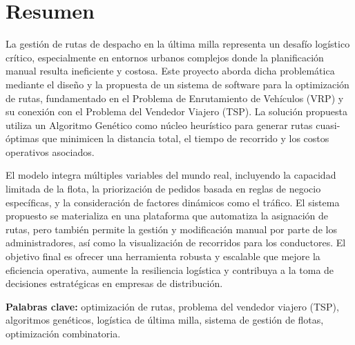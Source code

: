 \chapter*{Resumen}

La gestión de rutas de despacho en la última milla representa un desafío logístico crítico, especialmente en entornos urbanos complejos donde la planificación manual resulta ineficiente y costosa. Este proyecto aborda dicha problemática mediante el diseño y la propuesta de un sistema de software para la optimización de rutas, fundamentado en el Problema de Enrutamiento de Vehículos (VRP) y su conexión con el Problema del Vendedor Viajero (TSP). La solución propuesta utiliza un Algoritmo Genético como núcleo heurístico para generar rutas cuasi-óptimas que minimicen la distancia total, el tiempo de recorrido y los costos operativos asociados.

El modelo integra múltiples variables del mundo real, incluyendo la capacidad limitada de la flota, la priorización de pedidos basada en reglas de negocio específicas, y la consideración de factores dinámicos como el tráfico. El sistema propuesto se materializa en una plataforma que automatiza la asignación de rutas, pero también permite la gestión y modificación manual por parte de los administradores, así como la visualización de recorridos para los conductores. El objetivo final es ofrecer una herramienta robusta y escalable que mejore la eficiencia operativa, aumente la resiliencia logística y contribuya a la toma de decisiones estratégicas en empresas de distribución.

\vspace{1cm}
\noindent
\textbf{Palabras clave:} optimización de rutas, problema del vendedor viajero (TSP), algoritmos genéticos, logística de última milla, sistema de gestión de flotas, optimización combinatoria.